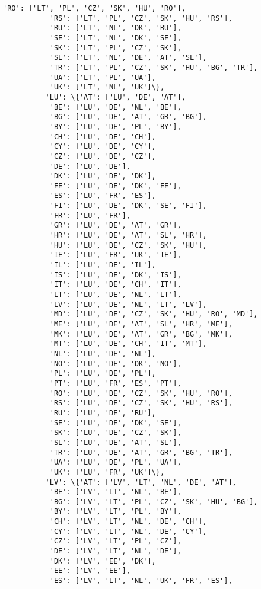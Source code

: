 \documentclass[11pt]{article}
\begin{document}
\begin{Verbatim}[commandchars=\\\{\}]
           'RO': ['LT', 'PL', 'CZ', 'SK', 'HU', 'RO'],
           'RS': ['LT', 'PL', 'CZ', 'SK', 'HU', 'RS'],
           'RU': ['LT', 'NL', 'DK', 'RU'],
           'SE': ['LT', 'NL', 'DK', 'SE'],
           'SK': ['LT', 'PL', 'CZ', 'SK'],
           'SL': ['LT', 'NL', 'DE', 'AT', 'SL'],
           'TR': ['LT', 'PL', 'CZ', 'SK', 'HU', 'BG', 'TR'],
           'UA': ['LT', 'PL', 'UA'],
           'UK': ['LT', 'NL', 'UK']\},
          'LU': \{'AT': ['LU', 'DE', 'AT'],
           'BE': ['LU', 'DE', 'NL', 'BE'],
           'BG': ['LU', 'DE', 'AT', 'GR', 'BG'],
           'BY': ['LU', 'DE', 'PL', 'BY'],
           'CH': ['LU', 'DE', 'CH'],
           'CY': ['LU', 'DE', 'CY'],
           'CZ': ['LU', 'DE', 'CZ'],
           'DE': ['LU', 'DE'],
           'DK': ['LU', 'DE', 'DK'],
           'EE': ['LU', 'DE', 'DK', 'EE'],
           'ES': ['LU', 'FR', 'ES'],
           'FI': ['LU', 'DE', 'DK', 'SE', 'FI'],
           'FR': ['LU', 'FR'],
           'GR': ['LU', 'DE', 'AT', 'GR'],
           'HR': ['LU', 'DE', 'AT', 'SL', 'HR'],
           'HU': ['LU', 'DE', 'CZ', 'SK', 'HU'],
           'IE': ['LU', 'FR', 'UK', 'IE'],
           'IL': ['LU', 'DE', 'IL'],
           'IS': ['LU', 'DE', 'DK', 'IS'],
           'IT': ['LU', 'DE', 'CH', 'IT'],
           'LT': ['LU', 'DE', 'NL', 'LT'],
           'LV': ['LU', 'DE', 'NL', 'LT', 'LV'],
           'MD': ['LU', 'DE', 'CZ', 'SK', 'HU', 'RO', 'MD'],
           'ME': ['LU', 'DE', 'AT', 'SL', 'HR', 'ME'],
           'MK': ['LU', 'DE', 'AT', 'GR', 'BG', 'MK'],
           'MT': ['LU', 'DE', 'CH', 'IT', 'MT'],
           'NL': ['LU', 'DE', 'NL'],
           'NO': ['LU', 'DE', 'DK', 'NO'],
           'PL': ['LU', 'DE', 'PL'],
           'PT': ['LU', 'FR', 'ES', 'PT'],
           'RO': ['LU', 'DE', 'CZ', 'SK', 'HU', 'RO'],
           'RS': ['LU', 'DE', 'CZ', 'SK', 'HU', 'RS'],
           'RU': ['LU', 'DE', 'RU'],
           'SE': ['LU', 'DE', 'DK', 'SE'],
           'SK': ['LU', 'DE', 'CZ', 'SK'],
           'SL': ['LU', 'DE', 'AT', 'SL'],
           'TR': ['LU', 'DE', 'AT', 'GR', 'BG', 'TR'],
           'UA': ['LU', 'DE', 'PL', 'UA'],
           'UK': ['LU', 'FR', 'UK']\},
          'LV': \{'AT': ['LV', 'LT', 'NL', 'DE', 'AT'],
           'BE': ['LV', 'LT', 'NL', 'BE'],
           'BG': ['LV', 'LT', 'PL', 'CZ', 'SK', 'HU', 'BG'],
           'BY': ['LV', 'LT', 'PL', 'BY'],
           'CH': ['LV', 'LT', 'NL', 'DE', 'CH'],
           'CY': ['LV', 'LT', 'NL', 'DE', 'CY'],
           'CZ': ['LV', 'LT', 'PL', 'CZ'],
           'DE': ['LV', 'LT', 'NL', 'DE'],
           'DK': ['LV', 'EE', 'DK'],
           'EE': ['LV', 'EE'],
           'ES': ['LV', 'LT', 'NL', 'UK', 'FR', 'ES'],

\end{Verbatim}
\end{document}

